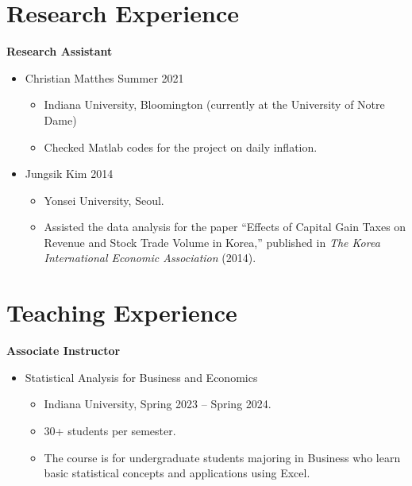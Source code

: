\documentclass[11pt,a4paper]{article}
\begin{document}
\section*{Research Experience}
\textbf{Research Assistant} 
\begin{itemize}[leftmargin=*]
    \item Christian Matthes \hfill Summer 2021
    \begin{itemize}
        \item Indiana University, Bloomington (currently at the University of Notre Dame)
        \item Checked Matlab codes for the project on daily inflation.    
    \end{itemize}
    \item Jungsik Kim \hfill 2014
    \begin{itemize}
        \item Yonsei University, Seoul.       
        \item Assisted the data analysis for the paper ``Effects of Capital Gain Taxes on Revenue and Stock Trade Volume in Korea,'' published in \emph{The Korea International Economic Association} (2014).
    \end{itemize}
\end{itemize}

\vspace{5mm}


\section*{Teaching Experience}
\textbf{Associate Instructor}
\begin{itemize}[leftmargin=*]   
    \item Statistical Analysis for Business and Economics
    \begin{itemize}[leftmargin=*]
        \item Indiana University, Spring 2023 -- Spring 2024.
        \item 30+ students per semester.
        \item The course is for undergraduate students majoring in Business who learn basic statistical concepts and applications using Excel.
    \end{itemize}
\end{itemize}
\end{document}
